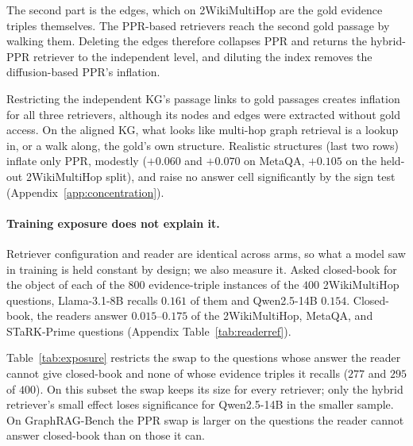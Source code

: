 \documentclass[11pt]{article}
\begin{document}
The second part is the edges, which on 2WikiMultiHop are the gold evidence triples themselves. The PPR-based retrievers reach the second gold passage by walking them. Deleting the edges therefore collapses PPR and returns the hybrid-PPR retriever to the independent level, and diluting the index removes the diffusion-based PPR's inflation.

Restricting the independent KG's passage links to gold passages creates inflation for all three retrievers, although its nodes and edges were extracted without gold access. On the aligned KG, what looks like multi-hop graph retrieval is a lookup in, or a walk along, the gold's own structure. Realistic structures (last two rows) inflate only PPR, modestly ($+0.060$ and $+0.070$ on MetaQA, $+0.105$ on the held-out 2WikiMultiHop split), and raise no answer cell significantly by the sign test (Appendix~\ref{app:concentration}).

\begin{table}[t]\centering\footnotesize
\setlength{\tabcolsep}{4pt}
\resizebox{\columnwidth}{!}{}
\caption{The swap persists on questions the reader cannot answer closed-book. Paired EM swap on 2WikiMultiHop, both splits pooled, on all questions and on the questions whose answer the reader cannot give closed-book and none of whose evidence triples it recalls (unknown). Triple recall: share of the $800$ evidence-triple instances the reader completes closed-book. Exact sign test, $^{**}p<0.01$.}
\label{tab:exposure}
\end{table}

\paragraph{Training exposure does not explain it.} Retriever configuration and reader are identical across arms, so what a model saw in training is held constant by design; we also measure it. Asked closed-book for the object of each of the $800$ evidence-triple instances of the $400$ 2WikiMultiHop questions, Llama-3.1-8B recalls $0.161$ of them and Qwen2.5-14B $0.154$. Closed-book, the readers answer $0.015$--$0.175$ of the 2WikiMultiHop, MetaQA, and STaRK-Prime questions (Appendix Table~\ref{tab:readerref}).

Table~\ref{tab:exposure} restricts the swap to the questions whose answer the reader cannot give closed-book and none of whose evidence triples it recalls ($277$ and $295$ of $400$). On this subset the swap keeps its size for every retriever; only the hybrid retriever's small effect loses significance for Qwen2.5-14B in the smaller sample. On GraphRAG-Bench the PPR swap is larger on the questions the reader cannot answer closed-book than on those it can.
\end{document}
